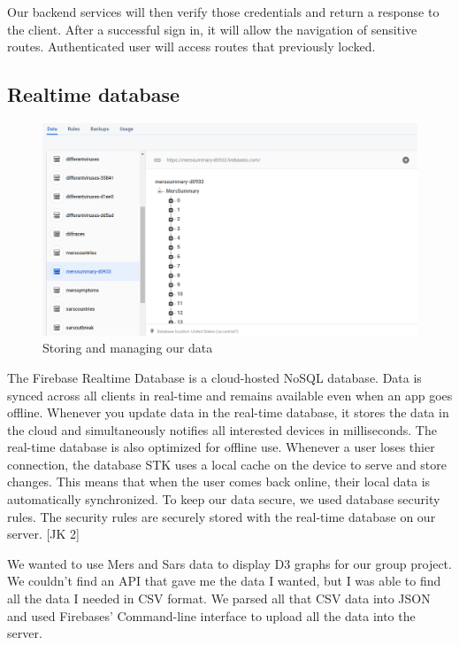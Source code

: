 Our backend services will then verify those credentials and return a response to the client.
After a successful sign in, it will allow the navigation of sensitive routes.
Authenticated user will access routes that previously locked.


\subsection{Realtime database}

\begin{figure}[ht]
    \centering
    \includegraphics[scale=0.4]{img/Firebasedb.PNG}
    \caption{Storing and managing our data}
    \label{fig:my_labe4}
\end{figure}


The Firebase Realtime Database is a cloud-hosted NoSQL database.
Data is synced across all clients in real-time and remains available even when an app goes offline.
Whenever you update data in the real-time database, it stores the data in the cloud and simultaneously notifies all interested devices in milliseconds. The real-time database is also optimized for offline use.
Whenever a user loses thier connection, the database STK uses a local cache on the device to serve and store changes. This means that when the user comes back online, their local data is automatically synchronized. To keep our data secure, we used database security rules.
The security rules are securely stored with the real-time database on our server. [JK 2]

\vspace{5mm}

We wanted to use Mers and Sars data to display D3 graphs for our group project.
We couldn’t find an API that gave me the data I wanted, but I was able to find all the data I needed in CSV format. 
We parsed all that CSV data into JSON and used Firebases’ Command-line interface to upload all the data into the server.


